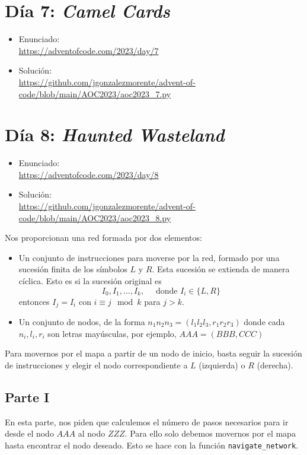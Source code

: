 \documentclass[a4paper,12pt]{article}
\begin{document}
\section{Día 7: \textnormal{ \it Camel Cards }}
\begin{itemize}
    \item Enunciado: \\
    \href{https://adventofcode.com/2023/day/7}{https://adventofcode.com/2023/day/7}
    \item Solución: \\ 
    \href{https://github.com/jgonzalezmorente/advent-of-code/blob/main/AOC2023/aoc2023_7.py}{https://github.com/jgonzalezmorente/advent-of-code/blob/main/AOC2023/aoc2023\_7.py}
\end{itemize}

\section{Día 8: \textnormal{ \it Haunted Wasteland }}
\begin{itemize}
    \item Enunciado: \\
    \href{https://adventofcode.com/2023/day/8}{https://adventofcode.com/2023/day/8}
    \item Solución: \\ 
    \href{https://github.com/jgonzalezmorente/advent-of-code/blob/main/AOC2023/aoc2023_8.py}{https://github.com/jgonzalezmorente/advent-of-code/blob/main/AOC2023/aoc2023\_8.py}
\end{itemize}

Nos proporcionan una red formada por dos elementos:
\begin{itemize}
    \item Un conjunto de instrucciones para moverse por la red, formado por una sucesión finita de los símbolos $L$ y $R$. Esta sucesión se extienda de manera cíclica. Esto es si la sucesión original es
    $$I_0, I_1, \dots, I_k, \quad\text{ donde } I_i\in\{L,R\}$$
    entonces $I_j=I_i$ con $i\equiv j\mod k$ para $j>k$.
    \item Un conjunto de nodos, de la forma $n_1n_2n_3 = (l_1l_2l_3, r_1r_2r_3)$ donde cada $n_i, l_i, r_i$ son letras mayúsculas, por ejemplo, $AAA=(BBB, CCC)$
\end{itemize}
Para movernos por el mapa a partir de un nodo de inicio, basta seguir la sucesión de instrucciones y elegir el nodo correspondiente a $L$ (izquierda) o $R$ (derecha). 

\subsection{Parte I}
En esta parte, nos piden que calculemos el número de pasos necesarios para ir desde el nodo $AAA$ al nodo $ZZZ$. Para ello solo debemos movernos por el mapa hasta encontrar el nodo deseado. Esto se hace con la función \lstinline{navigate_network}.
\end{document}
